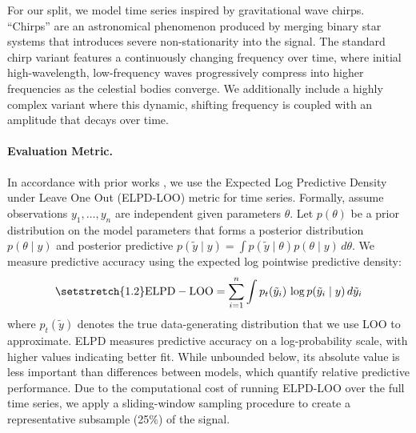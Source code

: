 \documentclass{article}
\newcommand\jl[1]{\todo[color=blue!40]{{\bf Jessy}: #1}}
\newcommand{\splitlabel}[3]{%
  \tikz[baseline=-0.6ex]{%
    \node[
      rounded corners=3pt,
      fill=#2,
      draw=#1,
      line width=0.8pt,
      inner xsep=4pt,
      inner ysep=2pt,
      font=\bfseries\small
    ] {#3};%
  }%
}
\newcommand{\Astro}{\splitlabel{astroblue}{astrofill}{Astro}}
\begin{document}
For our \protect\Astro{} split, we model time series inspired by gravitational wave chirps. ``Chirps'' are an astronomical phenomenon produced by merging binary star systems that introduces severe non-stationarity into the signal. The standard chirp variant features a continuously changing frequency over time, where initial high-wavelength, low-frequency waves progressively compress into higher frequencies as the celestial bodies converge. We additionally include a highly complex variant where this dynamic, shifting frequency is coupled with an amplitude that decays over time.

\paragraph{Evaluation Metric.}
\vspace{-0.3em}
In accordance with prior works \cite{box_lm}, we use the Expected Log Predictive Density under Leave One Out (ELPD-LOO) metric for time series. 
Formally, assume observations $y_1, \dots, y_n$ are independent given parameters $\theta$. Let $p(\theta)$ be a prior distribution on the model parameters that forms a posterior distribution $p(\theta \mid y)$ and posterior predictive $p(\tilde y \mid y) = \int p(\tilde y \mid \theta)p(\theta \mid y)\, d\theta$. We measure predictive accuracy using the expected log pointwise predictive density:
\begin{equation}
\setstretch{1.2}
    \mathrm{ELPD-LOO} = \sum_{i=1}^n \int p_t(\tilde y_i)\, \log p(\tilde y_i \mid y)\, d\tilde y_i
\end{equation}
where $p_t(\tilde{y})$ denotes the true data-generating distribution that we use LOO to approximate. ELPD measures predictive accuracy on a log-probability scale, with higher values indicating better fit. While unbounded below, its absolute value is less important than differences between models, which quantify relative predictive performance. Due to the computational cost of running ELPD-LOO over the full time series, we apply a sliding-window sampling procedure to create a representative subsample (25\%) of the signal.
\end{document}
